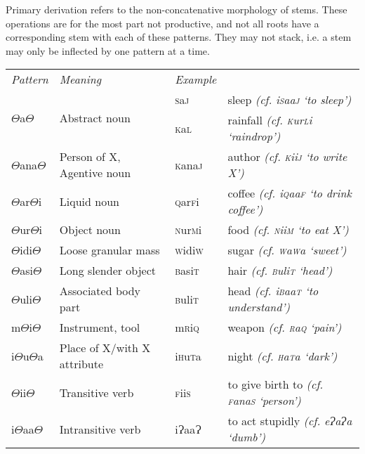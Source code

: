 \documentclass[a4paper,10pt,twoside,openright]{memoir}
\newcommand{\rootpart}{$\Theta$}
\newcommand{\bigglot}{Ɂ}
\begin{document}
Primary derivation refers to the non-concatenative morphology of stems. These operations are for the most part not productive, and not all roots have a corresponding stem with each of these patterns. They may not stack, i.e. a stem may only be inflected by one pattern at a time.

\begin{table}[ht]
    \centering
    \begin{tabular}{llll}
    \textit{Pattern} & \textit{Meaning} & \textit{Example} & \\
    \multirow{2}{*}{{\rootpart}a{\rootpart}} & \multirow{2}{*}{Abstract noun}& \textsc{s}a\textsc{j} & sleep \emph{(cf. i\textsc{s}aa\textsc{j} `to sleep')}\\
    & & \textsc{k}a\textsc{l} & rainfall \emph{(cf. \textsc{k}ur\textsc{l}i `raindrop')}\\
    {\rootpart}ana{\rootpart} & Person of X, Agentive noun & \textsc{k}ana\textsc{j} & author \emph{(cf. \textsc{k}ii\textsc{j} `to write X')}\\
    {\rootpart}ar{\rootpart}i & Liquid noun & \textsc{q}ar\textsc{f}i & coffee \emph{(cf. i\textsc{q}aa\textsc{f} `to drink coffee')} \\
    {\rootpart}ur{\rootpart}i & Object noun & \textsc{n}ur\textsc{m}i & food \emph{(cf. \textsc{n}ii\textsc{m} `to eat X')}\\
    {\rootpart}idi{\rootpart} & Loose granular mass & \textsc{w}idi\textsc{w} & sugar \emph{(cf. \textsc{w}a\textsc{w}a `sweet')} \\
    {\rootpart}asi{\rootpart} & Long slender object & \textsc{b}asi\textsc{t} & hair \emph{(cf. \textsc{b}uli\textsc{t} `head')} \\
    {\rootpart}uli{\rootpart} & Associated body part & \textsc{b}uli\textsc{t} & head \emph{(cf. i\textsc{b}aa\textsc{t} `to understand')}\\
    m{\rootpart}i{\rootpart} & Instrument, tool & m\textsc{r}i\textsc{q} & weapon \emph{(cf. \textsc{r}a\textsc{q} `pain')} \\
    i{\rootpart}u{\rootpart}a & Place of X/with X attribute & i\textsc{h}u\textsc{t}a & night \emph{(cf. \textsc{h}a\textsc{t}a `dark')} \\
    {\rootpart}ii{\rootpart} & Transitive verb & \textsc{f}ii\textsc{s} & to give birth to \emph{(cf. \textsc{f}ana\textsc{s} `person')} \\
    i{\rootpart}aa{\rootpart} & Intransitive verb & i{\bigglot}aa\bigglot & to act stupidly \emph{(cf. e\bigglot a\bigglot a `dumb')} \\

\end{tabular}
\end{table}
\end{document}

